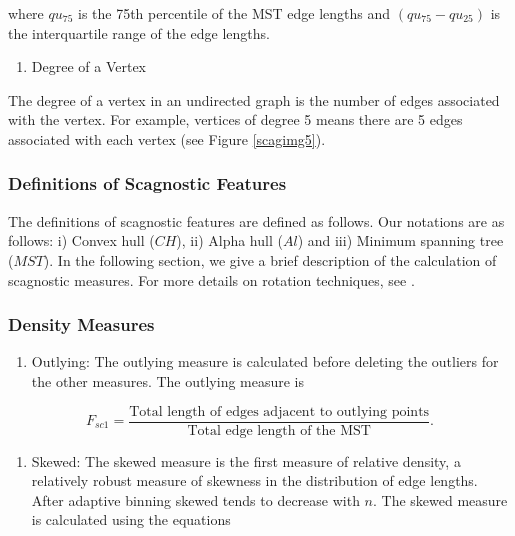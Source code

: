 \documentclass{article}
\newcommand{\tightlist}{%
\setlength{\itemsep}{0pt}\setlength{\parskip}{0pt}}
\begin{document}
where \(qu_{75}\) is the 75th percentile of the MST edge lengths and
\((qu_{75} - qu_{25})\) is the interquartile range of the edge lengths.

\begin{enumerate}
\def\labelenumi{\roman{enumi})}
\setcounter{enumi}{2}
\tightlist
\item
  Degree of a Vertex
\end{enumerate}

The degree of a vertex in an undirected graph is the number of
edges associated with the vertex. For example, vertices of degree 5
means there are 5 edges associated with each vertex (see Figure
\ref{scagimg5}).

\hypertarget{definitions-of-scagnostic-features}{%
\subsubsection{Definitions of Scagnostic
Features}\label{definitions-of-scagnostic-features}}

The definitions of scagnostic features are defined as follows. Our
notations are as follows: i) Convex hull (\(CH\)), ii) Alpha hull
(\(Al\)) and iii) Minimum spanning tree (\(MST\)). In the following
section, we give a brief description of the calculation of scagnostic
measures. For more details on rotation techniques, see \citet{article37}.

\hypertarget{density-measures}{%
\subsubsection{Density Measures}\label{density-measures}}

\begin{enumerate}
\def\labelenumi{\roman{enumi})}
\tightlist
\item
  Outlying: The outlying measure is calculated before deleting the
  outliers for the other measures. The outlying measure is
\end{enumerate}

\begin{equation}
      F_{sc1} = \frac{\text{Total length of edges adjacent to outlying points}}{\text{Total edge length of the MST}}.
\end{equation}

\begin{enumerate}
\def\labelenumi{\roman{enumi})}
\setcounter{enumi}{1}
\tightlist
\item
  Skewed: The skewed measure is the first measure of relative density, a relatively robust measure of skewness in the distribution
  of edge lengths. After adaptive binning skewed tends to decrease with
  \(n\). The skewed measure is calculated using the equations
\end{enumerate}
\end{document}
